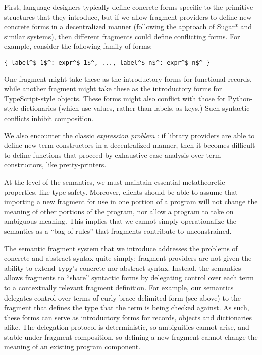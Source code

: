 \documentclass[preprint,10pt]{sigplanconf}
\newcommand{\typy}{\texttt{typy}}
\begin{document}
First, language designers typically define  concrete forms specific to the primitive structures that they introduce, but if we allow fragment providers to define new concrete forms in a decentralized manner (following the approach of Sugar* \cite{erdweg2013framework} and similar systems), then different fragments could define conflicting forms. For example, consider the following family of forms:
\begin{lstlisting}[numbers=none]
{ label^$_1$^: expr^$_1$^, ..., label^$_n$^: expr^$_n$^ }
\end{lstlisting}
One fragment might take these as the introductory forms for functional records, while another fragment might take these as the introductory forms for TypeScript-style objects. These forms might also conflict with those for Python-style dictionaries (which use values, rather than labels, as keys.) Such syntactic conflicts inhibit composition.

We also encounter the classic \emph{expression problem} \cite{wadler1998expression,Reynolds75}: if library providers are able to define new term constructors in a decentralized manner, then it becomes difficult to define functions that proceed by exhaustive case analysis over term  constructors, like pretty-printers.

At the level of the semantics, we must maintain essential metatheoretic properties, like type safety. Moreover, clients should be able to  assume that importing a new fragment for use in one portion of a program will not change the meaning of other portions of the program, nor allow a program to take on ambiguous meaning. This implies that we cannot simply operationalize the semantics as a ``bag of rules'' that fragments contribute to unconstrained.

The semantic fragment system that we introduce addresses the problems of concrete and abstract syntax quite simply: fragment providers are not given the ability to extend $\typy$'s concrete nor abstract syntax.  Instead, the semantics allows fragments to ``share'' syntactic forms by delegating control over each term to a contextually relevant fragment definition. For example, our semantics delegates control over terms of curly-brace delimited form (see above) to the fragment that defines the type that the term is being checked against. As such, these forms can serve as introductory forms for records, objects and dictionaries alike. The delegation protocol is deterministic, so ambiguities cannot arise, and stable under fragment composition, so defining a new fragment cannot change the meaning of an existing program component. 
\end{document}
